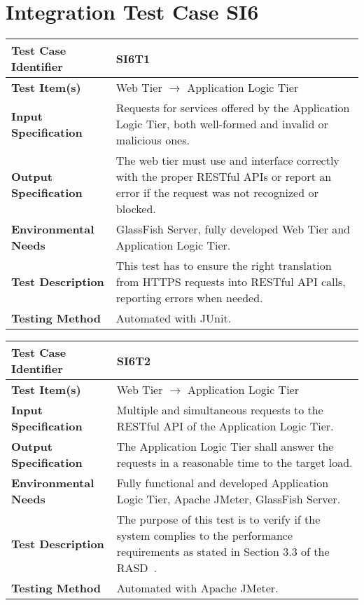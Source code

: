 \section{Integration Test Case SI6}

\begin{longtable}{p{0.3\textlength} | p{0.7\textlength}}
\hline
\textbf{Test Case Identifier} & SI6T1\\
\hline
\textbf{Test Item(s)} & Web Tier $\rightarrow$ Application Logic Tier \\
\hline
\textbf{Input Specification} & Requests for services offered by the Application Logic Tier, both well-formed and invalid or malicious ones. \\
\hline
\textbf{Output Specification} & The web tier must use and interface correctly with the proper RESTful APIs or report an error if the request was not recognized or blocked. \\
\hline
\textbf{Environmental Needs} & GlassFish Server, fully developed Web Tier and Application Logic Tier. \\
\hline
\textbf{Test Description} & This test has to ensure the right translation from HTTPS requests into RESTful API calls, reporting errors when needed. \\
\hline
\textbf{Testing Method} & Automated with JUnit. \\
\hline
\end{longtable}

\begin{longtable}{p{} | p{}}
\hline
\textbf{Test Case Identifier} & SI6T2\\
\hline
\textbf{Test Item(s)} & Web Tier $\rightarrow$ Application Logic Tier \\
\hline
\textbf{Input Specification} & Multiple and simultaneous requests to the RESTful API of the Application Logic Tier. \\
\hline
\textbf{Output Specification} & The Application Logic Tier shall answer the requests in a reasonable time to the target load. \\
\hline
\textbf{Environmental Needs} & Fully functional and developed Application Logic Tier, Apache JMeter, GlassFish Server. \\
\hline
\textbf{Test Description} & The purpose of this test is to verify if the system complies to the performance requirements as stated in Section 3.3 of the RASD~\cite{rasd}. \\
\hline
\textbf{Testing Method} & Automated with Apache JMeter. \\
\hline
\end{longtable}


